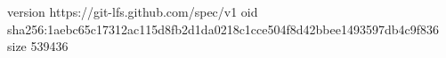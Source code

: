 version https://git-lfs.github.com/spec/v1
oid sha256:1aebc65c17312ac115d8fb2d1da0218c1cce504f8d42bbee1493597db4c9f836
size 539436
